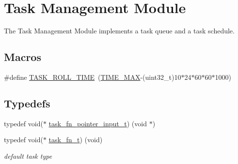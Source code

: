 \hypertarget{group__task}{}\section{Task Management Module}
\label{group__task}


The Task Management Module implements a task queue and a task schedule.  


\subsection*{Macros}
\begin{DoxyCompactItemize}
\item 
\#define \hyperlink{group__task_ga63e7ac0b07d5527e8110261f64661128}{T\+A\+S\+K\+\_\+\+R\+O\+L\+L\+\_\+\+T\+I\+M\+E}~(\hyperlink{group__timing_ga0540485394df82add6b7c4f2137c7f21}{T\+I\+M\+E\+\_\+\+M\+A\+X}-\/(uint32\+\_\+t)10$\ast$24$\ast$60$\ast$60$\ast$1000)
\end{DoxyCompactItemize}
\subsection*{Typedefs}
\begin{DoxyCompactItemize}
\item 
typedef void($\ast$ \hyperlink{group__task_ga08219bddd9fe09eb5192564ad47dad99}{task\+\_\+fn\+\_\+pointer\+\_\+input\+\_\+t}) (void $\ast$)
\item 
typedef void($\ast$ \hyperlink{group__task_ga318336c763a22ea5f1c49c52ac5b6fe2}{task\+\_\+fn\+\_\+t}) (void)
\begin{DoxyCompactList}\small\item\em default task type \end{DoxyCompactList}\end{DoxyCompactItemize}
